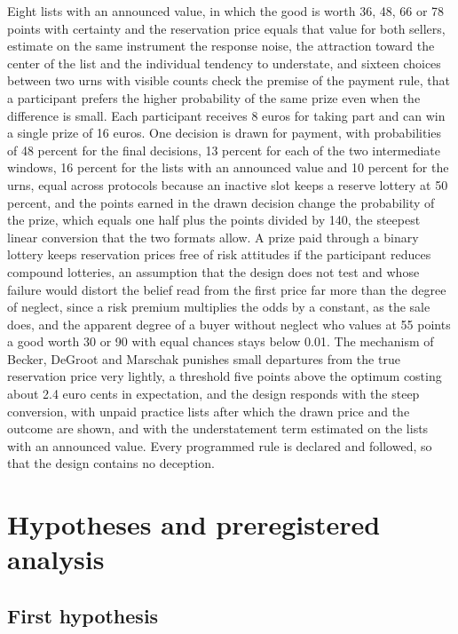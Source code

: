 \documentclass[11pt,a4paper]{article}
\begin{document}
Eight lists with an announced value, in which the good is worth 36, 48, 66 or 78 points with certainty and the reservation price equals that value for both sellers, estimate on the same instrument the response noise, the attraction toward the center of the list and the individual tendency to understate, and sixteen choices between two urns with visible counts check the premise of the payment rule, that a participant prefers the higher probability of the same prize even when the difference is small. Each participant receives 8 euros for taking part and can win a single prize of 16 euros. One decision is drawn for payment, with probabilities of 48 percent for the final decisions, 13 percent for each of the two intermediate windows, 16 percent for the lists with an announced value and 10 percent for the urns, equal across protocols because an inactive slot keeps a reserve lottery at 50 percent, and the points earned in the drawn decision change the probability of the prize, which equals one half plus the points divided by 140, the steepest linear conversion that the two formats allow. A prize paid through a binary lottery keeps reservation prices free of risk attitudes if the participant reduces compound lotteries, an assumption that the design does not test and whose failure would distort the belief read from the first price far more than the degree of neglect, since a risk premium multiplies the odds by a constant, as the sale does, and the apparent degree of a buyer without neglect who values at 55 points a good worth 30 or 90 with equal chances stays below 0.01. The mechanism of Becker, DeGroot and Marschak punishes small departures from the true reservation price very lightly, a threshold five points above the optimum costing about 2.4 euro cents in expectation, and the design responds with the steep conversion, with unpaid practice lists after which the drawn price and the outcome are shown, and with the understatement term estimated on the lists with an announced value. Every programmed rule is declared and followed, so that the design contains no deception.

\section{Hypotheses and preregistered analysis}

\subsection{First hypothesis}
\end{document}
